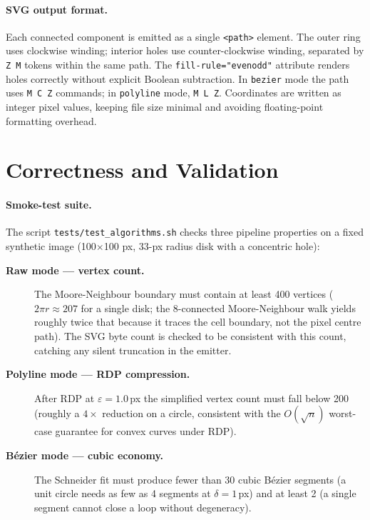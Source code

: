 \documentclass[twocolumn,a4paper,10pt]{article}
\begin{document}
\paragraph*{SVG output format.}
Each connected component is emitted as a single \texttt{<path>}
element.  The outer ring uses clockwise winding; interior holes use
counter-clockwise winding, separated by \texttt{Z\,M} tokens within
the same path.  The \texttt{fill-rule="evenodd"} attribute renders
holes correctly without explicit Boolean subtraction.  In
\texttt{bezier} mode the path uses \texttt{M\,C\,Z} commands; in
\texttt{polyline} mode, \texttt{M\,L\,Z}.  Coordinates are written as
integer pixel values, keeping file size minimal and avoiding
floating-point formatting overhead.

\section{Correctness and Validation}
\label{sec:correctness}

\paragraph*{Smoke-test suite.}
The script \texttt{tests/test\_algorithms.sh} checks three pipeline
properties on a fixed synthetic image (100$\times$100 px, $33$-px
radius disk with a concentric hole):

\begin{description}
\item[\textbf{Raw mode --- vertex count.}]  The Moore-Neighbour
  boundary must contain at least 400 vertices ($2\pi r \approx 207$
  for a single disk; the 8-connected Moore-Neighbour walk yields
  roughly twice that because it traces the cell boundary, not the
  pixel centre path).  The SVG byte count is checked to be consistent
  with this count, catching any silent truncation in the emitter.
\item[\textbf{Polyline mode --- RDP compression.}]  After RDP at
  $\varepsilon=1.0$\,px the simplified vertex count must fall below
  200 (roughly a $4\times$ reduction on a circle, consistent with the
  $O(\sqrt{n})$ worst-case guarantee for convex curves under RDP).
\item[\textbf{B\'ezier mode --- cubic economy.}]  The Schneider fit
  must produce fewer than 30 cubic B\'ezier segments (a unit circle
  needs as few as 4 segments at $\delta=1$\,px) and at least 2
  (a single segment cannot close a loop without degeneracy).
\end{description}
\end{document}
